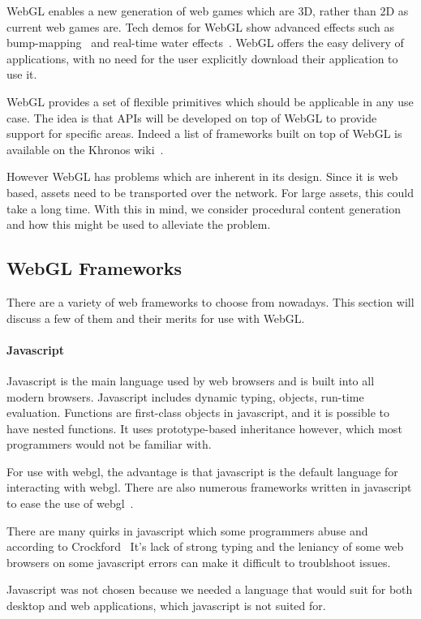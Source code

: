 WebGL enables a new generation of web games which are 3D, rather than 2D as current web games are.
Tech demos for WebGL show advanced effects such as bump-mapping~\cite{web:webglbumpmapping} and real-time water effects~\cite{web:webglwater}.
WebGL offers the easy delivery of applications, with no need for the user explicitly download their application to use it.

WebGL provides a set of flexible primitives which should be applicable in any use case.
The idea is that APIs will be developed on top of WebGL to provide support for specific areas.
Indeed a list of frameworks built on top of WebGL is available on the Khronos wiki~\cite{web:webglframeworks}.

However WebGL has problems which are inherent in its design.
Since it is web based, assets need to be transported over the network.
For large assets, this could take a long time.
With this in mind, we consider procedural content generation and how this might be used to alleviate the problem.

\subsection{WebGL Frameworks}
There are a variety of web frameworks to choose from nowadays.
This section will discuss a few of them and their merits for use with WebGL.

\paragraph{Javascript}
Javascript is the main language used by web browsers and is built into all modern browsers.
Javascript includes dynamic typing, objects, run-time evaluation.
Functions are first-class objects in javascript, and it is possible to have nested functions.
It uses prototype-based inheritance however, which most programmers would not be familiar with.

For use with webgl, the advantage is that javascript is the default language for interacting with webgl.
There are also numerous frameworks written in javascript to ease the use of webgl~\cite{web:threejs}\cite{web:copperlicht}. 

There are many quirks in javascript which some programmers abuse and according to Crockford~\cite{web:javascriptbadparts}
It's lack of strong typing and the leniancy of some web browsers on some javascript errors can make it difficult to troublshoot issues.

Javascript was not chosen because we needed a language that would suit for both desktop and web applications, which javascript is not suited for.

